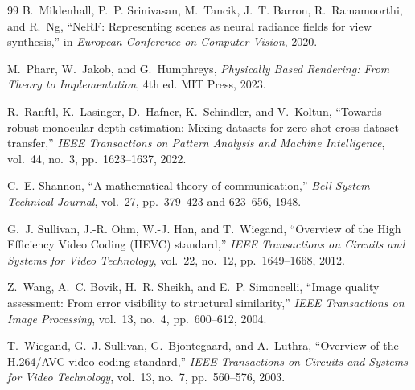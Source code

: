 \documentclass[12pt,a4paper]{article}
\theoremstyle{plain}
\theoremstyle{definition}
\theoremstyle{remark}
\begin{document}
\begin{thebibliography}{99}
B.~Mildenhall, P.~P. Srinivasan, M.~Tancik, J.~T. Barron, R.~Ramamoorthi, and R.~Ng, ``NeRF: Representing scenes as neural radiance fields for view synthesis,'' in \textit{European Conference on Computer Vision}, 2020.

M.~Pharr, W.~Jakob, and G.~Humphreys, \textit{Physically Based Rendering: From Theory to Implementation}, 4th ed. MIT Press, 2023.

R.~Ranftl, K.~Lasinger, D.~Hafner, K.~Schindler, and V.~Koltun, ``Towards robust monocular depth estimation: Mixing datasets for zero-shot cross-dataset transfer,'' \textit{IEEE Transactions on Pattern Analysis and Machine Intelligence}, vol.~44, no.~3, pp.~1623--1637, 2022.

C.~E. Shannon, ``A mathematical theory of communication,'' \textit{Bell System Technical Journal}, vol.~27, pp.~379--423 and 623--656, 1948.

G.~J. Sullivan, J.-R. Ohm, W.-J. Han, and T.~Wiegand, ``Overview of the High Efficiency Video Coding (HEVC) standard,'' \textit{IEEE Transactions on Circuits and Systems for Video Technology}, vol.~22, no.~12, pp.~1649--1668, 2012.

Z.~Wang, A.~C. Bovik, H.~R. Sheikh, and E.~P. Simoncelli, ``Image quality assessment: From error visibility to structural similarity,'' \textit{IEEE Transactions on Image Processing}, vol.~13, no.~4, pp.~600--612, 2004.

T.~Wiegand, G.~J. Sullivan, G.~Bjontegaard, and A.~Luthra, ``Overview of the H.264/AVC video coding standard,'' \textit{IEEE Transactions on Circuits and Systems for Video Technology}, vol.~13, no.~7, pp.~560--576, 2003.

\end{thebibliography}
\end{document}
